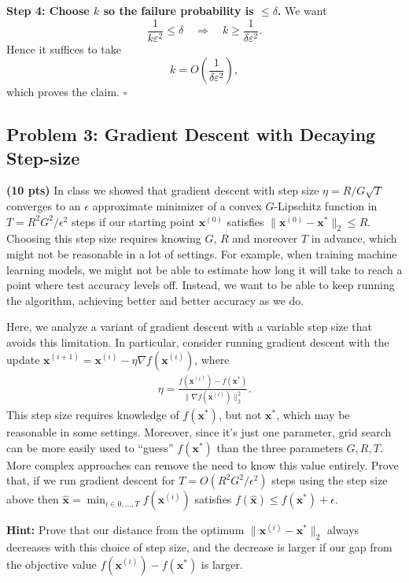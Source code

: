 \documentclass[10pt]{article}
\newcommand{\bv}[1]{\mathbf{#1}}
\begin{document}
\medskip
\textbf{Step 4: Choose $k$ so the failure probability is $\le \delta$.}
We want
\[
\frac{1}{k\varepsilon^2}\le \delta
\quad\Longrightarrow\quad
k \ge \frac{1}{\delta\varepsilon^2}.
\]
Hence it suffices to take
\[
\boxed{
k = O\!\left(\frac{1}{\delta\varepsilon^2}\right),
}
\]
which proves the claim. $\square$



\subsection{Problem 3: Gradient Descent with Decaying Step-size}
\textbf{(10 pts)}
In class we showed that gradient descent with step size $\eta = R/G\sqrt{T}$ converges to an $\epsilon$ approximate minimizer of a convex $G$-Lipschitz function in $T = R^2G^2/\epsilon^2$ steps if our starting point $\bv{x}^{(0)}$ satisfies $\|\bv{x}^{(0)} - \bv{x}^*\|_2 \leq R$. 
Choosing this step size requires knowing $G$, $R$ and moreover $T$ in advance, which might not be reasonable in a lot of settings. For example, when training machine learning models, we might not be able to estimate how long it will take to reach a point where test accuracy levels off. Instead, we want to be able to keep running the algorithm, achieving better and better accuracy as we do. 

Here, we analyze a variant of gradient descent with a variable step size that avoids this limitation. In particular, consider running gradient descent with the update $\bv{x}^{(i+1)} = \bv{x}^{(i)}- \eta \nabla f(\bv{x}^{(i)})$, where
\begin{align*}
	\eta = \frac{f(\bv{x}^{(i)}) - f(\bv{x}^{*})}{\|\nabla f(\bv{x}^{(i)})\|_2^2}.
\end{align*}
This step size requires knowledge of $f(\bv{x}^{*})$, but not $\bv{x}^*$, which may be reasonable in some settings. Moreover, since it's just one parameter, grid search can be more easily used to ``guess'' $f(\bv{x}^{*})$ than the three parameters $G,R,T$. More complex approaches can remove the need to know this value entirely.
Prove that, if we run gradient descent for $T = O(R^2G^2/\epsilon^2)$ steps using the step size above then $\hat{\bv{x}} = \min_{i \in 0, \ldots, T}f(\bv{x}^{(i)})$ satisfies $f(\hat{\bv{x}}) \leq f(\bv{x}^*) + \epsilon$. 

\textbf{Hint:} Prove that our distance from the optimum $\|\bv{x}^{(i)} - \bv{x}^*\|_2$ {always decreases} with this choice of step size, and the decrease is larger if our gap from the objective value $f(\bv{x}^{(i)}) - f(\bv{x}^{*})$ is larger.
\end{document}
